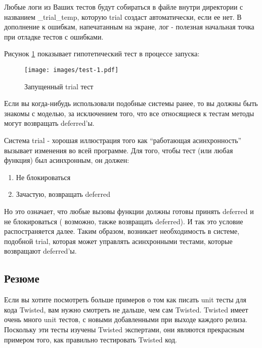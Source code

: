 Любые логи из Ваших тестов будут собираться в файле 
внутри директории с названием \_trial\_temp, 
которую trial создаст автоматически, если ее нет. 
В дополнение к ошибкам, напечатанным на экране, 
лог - полезная начальная точка при отладке тестов с ошибками. 

Рисунок \ref{fig:test-1} показывает гипотетический тест в 
процессе запуска:

\begin{figure}[h]
\begin{center}
    \texttt{[image: images/test-1.pdf]}
    \caption{Запущенный trial тест\label{fig:test-1}}
\end{center}
\end{figure}


Если вы когда-нибудь использовали подобные системы ранее, 
то вы должны быть знакомы с моделью, за исключением того, что 
все относящиеся к тестам методы могут возвращать deferred'ы.

Система trial - хорошая иллюстрация того как 
``работающая асинхронность'' вызывает изменения во всей программе. 
Для того, чтобы тест (или любая функция) был асинхронным, он должен:

\begin{enumerate}

\item Не блокироваться
\item Зачастую, возвращать deferred

\end{enumerate}


Но это означает, что любые вызовы функции должны 
готовы принять deferred и не блокироваться (
возможно, также возвращать deferred). И так это условие 
распостраняется далее. Таким образом, возникает необходимость в системе, 
подобной trial, которая может управлять асинхронными тестами, которые 
возвращают deferred'ы.

\subsection{Резюме}

Если вы хотите посмотреть больше 
примеров о том как писать unit тесты для кода Twisted, 
вам нужно смотреть не дальше, чем сам Twisted. Twisted 
имеет очень много unit тестов, с новыми добавленными при  
выходе каждого релиза. Поскольку эти тесты изучены 
Twisted экспертами, они являются прекрасным примером того, как 
правильно тестировать Twisted код.


